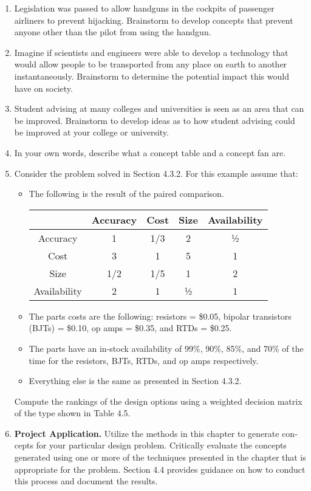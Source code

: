 \begin{enumerate}
\item
  Legislation was passed to allow handguns in the cockpits of passenger
  airliners to prevent hijacking. Brainstorm to develop concepts that
  prevent anyone other than the pilot from using the handgun.
\item
  Imagine if scientists and engineers were able to develop a technology
  that would allow people to be transported from any place on earth to
  another instantaneously. Brainstorm to determine the potential impact
  this would have on society.
\item
  Student advising at many colleges and universities is seen as an area
  that can be im­proved. Brainstorm to develop ideas as to how student
  advising could be improved at your college or university.
\item
  In your own words, describe what a concept table and a concept fan
  are.
\item
  Consider the problem solved in Section 4.3.2. For this example assume
  that:
\begin{itemize}

\item
  The following is the result of the paired comparison.

\begin{table}
\begin{tabular}{|c|c|c|c|c|}
\hline
              &
Accuracy &
Cost &
Size &
Availability \\ \hline
Accuracy & 1 & 1/3 & 2 & ½ \\ \hline
Cost & 3 & 1 & 5 & 1 \\ \hline
Size & 1/2 & 1/5 & 1 & 2 \\ \hline
Availability & 2 & 1 & ½ & 1 \\ \hline
\end{tabular}
\end{table}


\item
  The parts costs are the following: resistors = \$0.05, bipolar
  transistors (BJTs) = \$0.10, op amps = \$0.35, and RTDs = \$0.25.
\item
  The parts have an in-stock availability of 99\%, 90\%, 85\%, and 70\%
  of the time for the re­sistors, BJTs, RTDs, and op amps respectively.
\item
  Everything else is the same as presented in Section 4.3.2.
\end{itemize}

Compute the rankings of the design options using a weighted decision
matrix of the type shown in Table 4.5.


\item
  \textbf{Project Application.} Utilize the methods in this chapter to
  generate con­cepts for your particular design problem. Critically
  evaluate the concepts generated using one or more of the techniques
  presented in the chapter that is appropriate for the problem. Section
  4.4 pro­vides guidance on how to conduct this process and document the
  results.
\end{enumerate}

